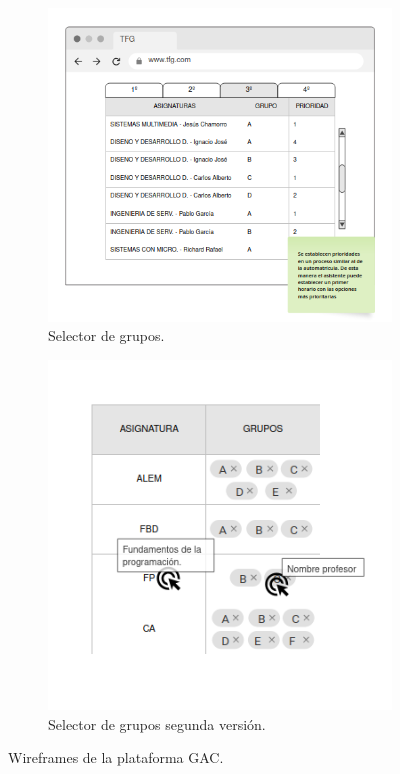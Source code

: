 \begin{figure}[H]
    \begin{subfigure}[b]{0.48\textwidth}
        \includegraphics[width=\textwidth]{./imagenes/Mockup_asignaturas.png}
        \caption{Selector de grupos.}
    \end{subfigure}
    \hfill
    \begin{subfigure}[b]{0.48\textwidth}
        \includegraphics[width=\textwidth]{./imagenes/Mockup_grupos.png}
        \caption{Selector de grupos segunda versión.}
    \end{subfigure}
    \caption{Wireframes de la plataforma GAC.}
\end{figure}


